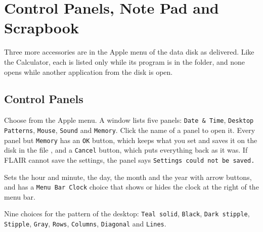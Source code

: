 \chapter{Control Panels, Note Pad and Scrapbook}
\label{ch:moreacc}

Three more accessories are in the Apple menu of the data disk as delivered.
Like the Calculator, each is listed only while its program is in the
 folder, and none opens while another application from the disk
is open.

\section{Control Panels}
Choose  from the Apple menu.  A window lists five
panels: \texttt{Date \& Time}, \texttt{Desktop Patterns}, \texttt{Mouse},
\texttt{Sound} and \texttt{Memory}.  Click the name of a panel to open it.
Every panel but \texttt{Memory} has an \texttt{OK} button, which keeps what
you set and saves it on the disk in the file , and a
\texttt{Cancel} button, which puts everything back as it was.  If FLAIR
cannot save the settings, the panel says \texttt{Settings could not be
saved.}

Sets the hour and minute, the day, the month and the
year with arrow buttons, and has a \texttt{Menu Bar Clock} choice that shows
or hides the clock at the right of the menu bar.

Nine choices for the pattern of the desktop:
\texttt{Teal solid}, \texttt{Black}, \texttt{Dark stipple}, \texttt{Stipple},
\texttt{Gray}, \texttt{Rows}, \texttt{Columns}, \texttt{Diagonal} and
\texttt{Lines}.

